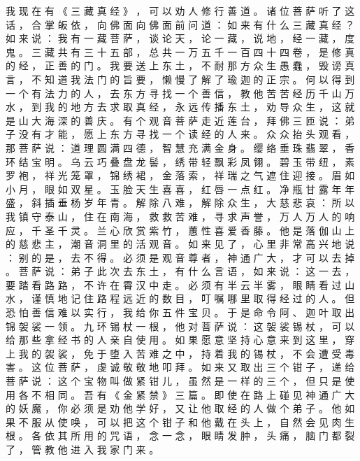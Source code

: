 {我 现 在 有 《 三 藏 真 经 》 ， 可 以 劝 人 修 行 善 道 。
诸 位 菩 萨 听 了 这 话 ， 合 掌 皈 依 ， 向 佛 面 向 佛 面 前 问 道 ： 如 来 有 什 么 三 藏 真 经 ？ 如 来 说 ： 我 有 一 藏 菩 萨 ， 谈 论 天 ， 论 一 藏 ， 说 地 ， 经 一 藏 ， 度 鬼 。
三 藏 共 有 三 十 五 部 ， 总 共 一 万 五 千 一 百 四 十 四 卷 ， 是 修 真 的 经 ， 正 善 的 门 。
我 要 送 上 东 土 ， 不 耐 那 方 众 生 愚 蠢 ， 毁 谤 真 言 ， 不 知 道 我 法 门 的 旨 要 ， 懒 慢 了 解 了 瑜 迦 的 正 宗 。
何 以 得 到 一 个 有 法 力 的 人 ， 去 东 方 寻 找 一 个 善 信 ， 教 他 苦 苦 经 历 千 山 万 水 ， 到 我 的 地 方 去 求 取 真 经 ， 永 远 传 播 东 土 ， 劝 导 众 生 ， 这 就 是 山 大 海 深 的 善 庆 。
有 个 观 音 菩 萨 走 近 莲 台 ， 拜 佛 三 匝 说 ： 弟 子 没 有 才 能 ， 愿 上 东 方 寻 找 一 个 读 经 的 人 来 。
众 众 抬 头 观 看 ， 那 菩 萨 说 ： 道 理 圆 满 四 德 ， 智 慧 充 满 金 身 。
缨 络 垂 珠 翡 翠 ， 香 环 结 宝 明 。
乌 云 巧 叠 盘 龙 髻 ， 绣 带 轻 飘 彩 凤 翎 。
碧 玉 带 纽 ， 素 罗 袍 ， 祥 光 笼 罩 ， 锦 绣 裙 ， 金 落 索 ， 祥 瑞 之 气 遮 住 迎 接 。
眉 如 小 月 ， 眼 如 双 星 。
玉 脸 天 生 喜 喜 ， 红 唇 一 点 红 。
净 瓶 甘 露 年 年 盛 ， 斜 插 垂 杨 岁 年 青 。
解 除 八 难 ， 解 除 众 生 ， 大 慈 悲 哀 ： 所 以 我 镇 守 泰 山 ， 住 在 南 海 ， 救 救 苦 难 ， 寻 求 声 誉 ， 万 人 万 人 的 响 应 ， 千 圣 千 灵 。
兰 心 欣 赏 紫 竹 ， 蕙 性 喜 爱 香 藤 。
他 是 落 伽 山 上 的 慈 悲 主 ， 潮 音 洞 里 的 活 观 音 。
如 来 见 了 ， 心 里 非 常 高 兴 地 说 ： 别 的 是 ， 去 不 得 。
必 须 是 观 音 尊 者 ， 神 通 广 大 ， 才 可 以 去 掉 。
菩 萨 说 ： 弟 子 此 次 去 东 土 ， 有 什 么 言 语 ， 如 来 说 ： 这 一 去 ， 要 踏 看 路 路 ， 不 许 在 霄 汉 中 走 。
必 须 有 半 云 半 雾 ， 眼 睛 看 过 山 水 ， 谨 慎 地 记 住 路 程 远 近 的 数 目 ， 叮 嘱 哪 里 取 得 经 过 的 人 。
但 恐 怕 善 信 难 以 实 行 ， 我 给 你 五 件 宝 贝 。
于 是 命 令 阿 、 迦 叶 取 出 锦 袈 裟 一 领 。
九 环 锡 杖 一 根 ， 他 对 菩 萨 说 ： 这 袈 裟 锡 杖 ， 可 以 给 那 些 拿 经 书 的 人 亲 自 使 用 。
如 果 愿 意 坚 持 心 意 来 到 这 里 ， 穿 上 我 的 袈 裟 ， 免 于 堕 入 苦 难 之 中 ， 持 着 我 的 锡 杖 ， 不 会 遭 受 毒 害 。
这 位 菩 萨 ， 虔 诚 敬 敬 地 叩 拜 。
如 来 又 取 出 三 个 钳 子 ， 递 给 菩 萨 说 ： 这 个 宝 物 叫 做 紧 钳 儿 ， 虽 然 是 一 样 的 三 个 ， 但 只 是 使 用 各 不 相 同 。
吾 有 《 金 紧 禁 》 三 篇 。
即 使 在 路 上 碰 见 神 通 广 大 的 妖 魔 ， 你 必 须 是 劝 他 学 好 ， 又 让 他 取 经 的 人 做 个 弟 子 。
他 如 果 不 服 从 使 唤 ， 可 以 把 这 个 钳 子 和 他 戴 在 头 上 ， 自 然 会 见 肉 生 根 。
各 依 其 所 用 的 咒 语 ， 念 一 念 ， 眼 睛 发 肿 ， 头 痛 ， 脑 门 都 裂 了 ， 管 教 他 进 入 我 家 门 来 。
}
